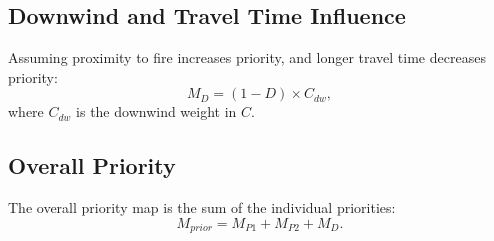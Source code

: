 \documentclass{article}
\begin{document}
\subsection*{Downwind and Travel Time Influence}
Assuming proximity to fire increases priority, and longer travel time decreases priority:
\[ M_{D} = (1 - D) \times C_{dw}, \]
where $C_{dw}$ is the downwind weight in $C$.

\subsection*{Overall Priority}
The overall priority map is the sum of the individual priorities:
\[ M_{prior} = M_{P1} + M_{P2} + M_{D}. \]
\end{document}
